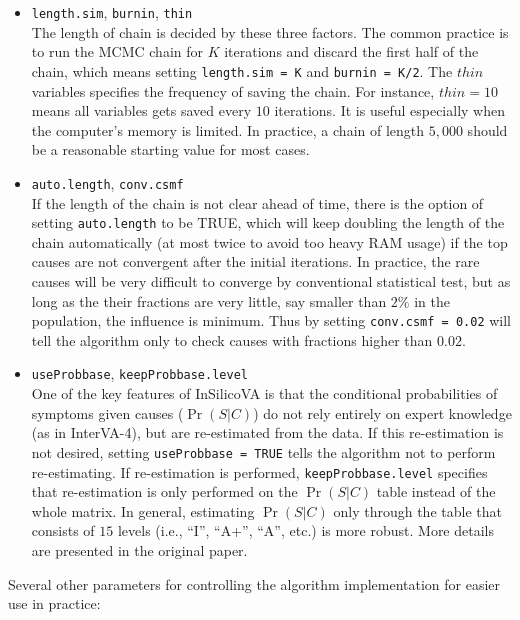\documentclass{article}\usepackage[]{graphicx}\usepackage[]{color}
\makeatletter
\newcommand\code{\bgroup\@makeother\_\@makeother\~\@makeother\$\@codex}
\def\@codex#1{{\normalfont\ttfamily\hyphenchar\font=-1 #1}\egroup}
\let\code=\texttt
\makeatother
\begin{document}
\begin{itemize}
	\item {\code{length.sim}, \code{burnin}, \code{thin}}\\ The length of chain is decided by these three factors. The common practice is to run the MCMC chain for $K$ iterations and discard the first half of the chain, which means setting \code{length.sim = K} and \code{burnin = K/2}. The $thin$ variables specifies the frequency of saving the chain. For instance, $thin = 10$ means all variables gets saved every $10$ iterations. It is useful especially when the computer's memory is limited. In practice, a chain of length $5,000$ should be a reasonable starting value for most cases. 

	\item{ \code{auto.length}, \code{conv.csmf}}\\ If the length of the chain is not clear ahead of time, there is the option of setting \code{auto.length} to be TRUE, which will keep doubling the length of the chain automatically (at most twice to avoid too heavy RAM usage) if the top causes are not convergent after the initial iterations. In practice, the rare causes will be very difficult to converge by conventional statistical test, but as long as the their fractions are very little, say smaller than $2\%$ in the population, the influence is minimum. Thus by setting \code{conv.csmf = 0.02} will tell the algorithm only to check causes with fractions higher than $0.02$.  

	\item{\code{useProbbase}, \code{keepProbbase.level}}\\ One of the key features of InSilicoVA is that the conditional probabilities of symptoms given causes ($\Pr(S|C)$) do not rely entirely on expert knowledge (as in InterVA-4), but are re-estimated from the data. If this re-estimation is not desired, setting \code{useProbbase = TRUE} tells the algorithm not to perform re-estimating. If re-estimation is performed, \code{keepProbbase.level} specifies that re-estimation is only performed on the $\Pr(S|C)$ table instead of the whole matrix. In general, estimating $\Pr(S|C)$ only through the table that consists of $15$ levels (i.e., ``I'', ``A+'', ``A'', etc.) is more robust. More details are presented in the original paper.

\end{itemize}

Several other parameters for controlling the algorithm implementation for easier use in practice:
\end{document}
